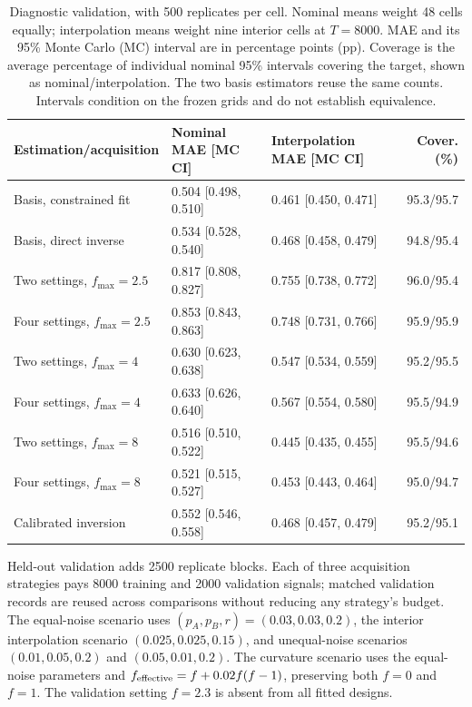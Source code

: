 \begin{table}[!htbp]
\centering
\small\setlength{\tabcolsep}{4pt}
\caption{Diagnostic validation, with 500 replicates per cell. Nominal means weight 48 cells equally; interpolation means weight nine interior cells at $T=8000$. MAE and its 95\% Monte Carlo (MC) interval are in percentage points (pp). Coverage is the average percentage of individual nominal 95\% intervals covering the target, shown as nominal/interpolation. The two basis estimators reuse the same counts. Intervals condition on the frozen grids and do not establish equivalence.}
\label{tab:validation}
\begin{tabular}{@{}lllr@{}}
\toprule
Estimation/acquisition & Nominal MAE [MC CI] & Interpolation MAE [MC CI] & Cover. (\%) \\
\midrule
Basis, constrained fit & 0.504 [0.498, 0.510] & 0.461 [0.450, 0.471] & 95.3/95.7 \\
Basis, direct inverse & 0.534 [0.528, 0.540] & 0.468 [0.458, 0.479] & 94.8/95.4 \\
Two settings, $f_{\max}=2.5$ & 0.817 [0.808, 0.827] & 0.755 [0.738, 0.772] & 96.0/95.4 \\
Four settings, $f_{\max}=2.5$ & 0.853 [0.843, 0.863] & 0.748 [0.731, 0.766] & 95.9/95.9 \\
Two settings, $f_{\max}=4$ & 0.630 [0.623, 0.638] & 0.547 [0.534, 0.559] & 95.2/95.5 \\
Four settings, $f_{\max}=4$ & 0.633 [0.626, 0.640] & 0.567 [0.554, 0.580] & 95.5/94.9 \\
Two settings, $f_{\max}=8$ & 0.516 [0.510, 0.522] & 0.445 [0.435, 0.455] & 95.5/94.6 \\
Four settings, $f_{\max}=8$ & 0.521 [0.515, 0.527] & 0.453 [0.443, 0.464] & 95.0/94.7 \\
Calibrated inversion & 0.552 [0.546, 0.558] & 0.468 [0.457, 0.479] & 95.2/95.1 \\
\bottomrule
\end{tabular}
\end{table}
Held-out validation adds 2500 replicate blocks. Each of three acquisition
strategies pays 8000 training and 2000 validation signals; matched validation
records are reused across comparisons without reducing any strategy's budget.
The equal-noise scenario uses $(p_A,p_B,r)=(0.03,0.03,0.2)$, the interior interpolation scenario
$(0.025,0.025,0.15)$, and unequal-noise scenarios $(0.01,0.05,0.2)$ and
$(0.05,0.01,0.2)$. The curvature scenario uses the equal-noise parameters and
$f_{\rm effective}=f+0.02f(f-1)$, preserving both $f=0$ and $f=1$.
The validation setting $f=2.3$ is absent from all fitted designs.


